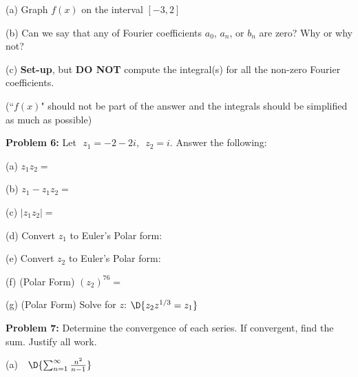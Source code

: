 \documentclass[12pt]{amsart}
\numberwithin{equation}{section}
\begin{document}
\vspace{0.1cm}

(a) Graph $f(x)$ on the interval $[-3,2]$

\vspace{6.2cm}

(b) Can we say that any of Fourier coefficients $a_0$, $a_n$, or $b_n$ are zero? Why or why not?

\vspace{1.8cm}

(c) {\bf Set-up}, but {\bf DO NOT} compute the integral(s) for all the non-zero Fourier coefficients. 

(``$f(x)$" should not be part of the answer and the integrals should be simplified as much as possible)

\thispagestyle{empty}
\newpage
\thispagestyle{empty}

{\bf Problem 6:} Let \,\,$z_1 = -2-2i$,\,\, $z_2 = i$. \quad Answer the following:

\vspace{0.2cm}

(a) $z_1z_2 = $

\vspace{1.8cm}

(b) $z_1-z_1z_2 = $

\vspace{1.8cm}

(c) $|z_1z_2| = $

\vspace{2.8cm}

(d) Convert $z_1$ to Euler's Polar form:

\vspace{2.8cm}

(e) Convert $z_2$ to Euler's Polar form:

\vspace{2.8cm}

(f) (Polar Form) $(z_2)^{76} = $

\vspace{2.8cm}

(g) (Polar Form) Solve for $z$: \quad $\D{z_2z^{1/3} = z_1}$

\thispagestyle{empty}
\newpage
\thispagestyle{empty}

{\bf Problem 7:} Determine the convergence of each series.  If convergent, find the sum.  Justify all work.

\vspace{0.1cm}

(a) \,\, $\D{\sum_{n=1}^\infty \frac{n^2}{n-1}}$
\end{document}
